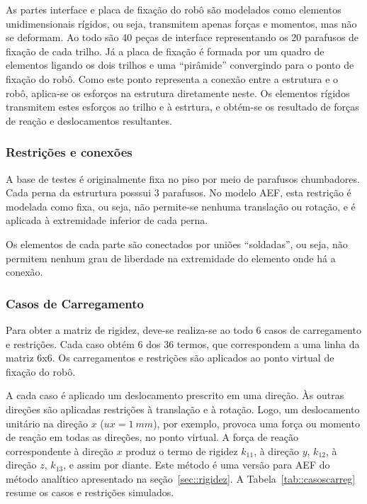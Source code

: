 As partes interface e placa de fixação do robô são modelados como elementos
unidimensionais rígidos, ou seja, transmitem apenas forças e momentos, mas não
se deformam. Ao todo são 40 peças de interface representando os 20 parafusos de
fixação de cada trilho. Já a placa de fixação é formada por um quadro de
elementos ligando os dois trilhos e uma ``pirâmide'' convergindo para o ponto de
fixação do robô. Como este ponto representa a conexão entre a estrutura e o
robô, aplica-se os esforços na estrutura diretamente neste. Os elementos
rígidos transmitem estes esforços ao trilho e à estrtura, e obtém-se os
resultado de forças de reação e deslocamentos resultantes.


\subsubsection{Restrições e conexões}

A base de testes é originalmente fixa no piso por meio de parafusos chumbadores.
Cada perna da estrurtura posssui 3 parafusos. No modelo AEF, esta restrição é
modelada como fixa, ou seja, não permite-se nenhuma translação ou rotação, e
é aplicada à extremidade inferior de cada perna.

Os elementos de cada parte são conectados por uniões ``soldadas'', ou seja, não
permitem nenhum grau de liberdade na extremidade do elemento onde há a conexão.


\subsubsection{Casos de Carregamento}

Para obter a matriz de rigidez, deve-se realiza-se ao todo 6 casos de
carregamento e restrições. Cada caso obtém 6 dos 36 termos, que correspondem a uma linha
da matriz 6x6. Os carregamentos e restrições são aplicados ao ponto virtual de
fixação do robô.

A cada caso é aplicado um deslocamento prescrito em uma direção. Às outras
direções são aplicadas restrições à translação e à rotação. Logo, um
deslocamento unitário na direção $x$ ($ux = 1~mm$), por exemplo, provoca uma
força ou momento de reação em todas as direções, no ponto virtual. A força de
reação correspondente à direção $x$ produz o termo de rigidez $k_{11}$, à
direção $y$, $k_{12}$, à direção $z$, $k_{13}$, e assim por diante. Este método
é uma versão para AEF do método analítico apresentado na
seção~\ref{sec::rigidez}. A Tabela~\ref{tab::casoscarreg} resume os casos e
restrições simulados.

